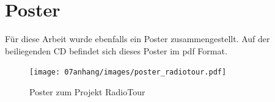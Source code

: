 \section{Poster}
Für diese Arbeit wurde ebenfalls ein Poster zusammengestellt. Auf der beiliegenden CD befindet sich dieses Poster im pdf Format.

\begin{figure}[h!]
\caption{Poster zum Projekt RadioTour}
\centering
\texttt{[image: 07anhang/images/poster\_radiotour.pdf]}
\end{figure} 

